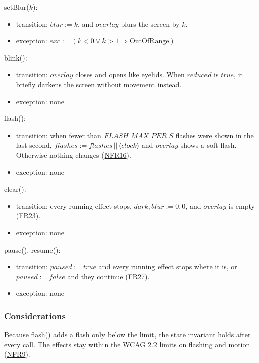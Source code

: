 \documentclass[10pt, titlepage]{article}
\newcommand{\srsurl}{https://team-hindsight.github.io/ophthamology-game/SRS/SRS.pdf}
\newcommand{\srsitemref}[2]{\href{\srsurl\#nameddest=#1}{#2}}
\newcommand{\T}[1]{\mathit{#1}}          %
\newcommand{\exc}{\mathit{exc}}
\newcommand{\true}{\mathit{true}}
\newcommand{\false}{\mathit{false}}
\begin{document}
\noindent setBlur($k$):
\begin{itemize}
\item transition: $\T{blur} := k$, and $\T{overlay}$ blurs the screen by $k$.
\item exception: $\exc := (k < 0 \vee k > 1 \Rightarrow \text{OutOfRange})$
\end{itemize}

\noindent blink():
\begin{itemize}
\item transition: $\T{overlay}$ closes and opens like eyelids. When
  $\T{reduced}$ is $\true$, it briefly darkens the screen without movement
  instead.
\item exception: none
\end{itemize}

\noindent flash():
\begin{itemize}
\item transition: when fewer than $\T{FLASH\_MAX\_PER\_S}$ flashes were shown
  in the last second, $\T{flashes} := \T{flashes} \,||\, \langle \T{clock}
  \rangle$ and $\T{overlay}$ shows a soft flash. Otherwise nothing changes
  (\srsitemref{NFR_Flashing}{NFR16}).
\item exception: none
\end{itemize}

\noindent clear():
\begin{itemize}
\item transition: every running effect stops, $\T{dark}, \T{blur} := 0, 0$,
  and $\T{overlay}$ is empty (\srsitemref{FR_StopOnExit}{FR23}).
\item exception: none
\end{itemize}

\noindent pause(), resume():
\begin{itemize}
\item transition: $\T{paused} := \true$ and every running effect stops where
  it is, or $\T{paused} := \false$ and they continue
  (\srsitemref{FR_Suspend}{FR27}).
\item exception: none
\end{itemize}

\subsubsection{Considerations}

Because flash() adds a flash only below the limit, the state invariant holds
after every call. The effects stay within the WCAG 2.2 limits on flashing and
motion (\srsitemref{NFR_Accessibility}{NFR9}).
\end{document}
